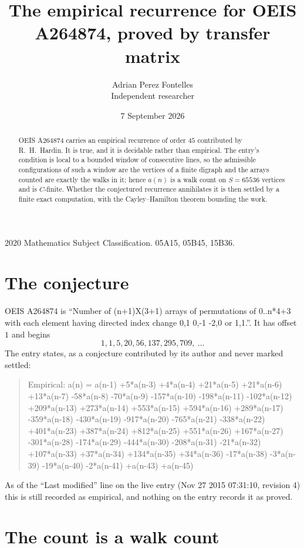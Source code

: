 \documentclass[11pt,a4paper]{article}
\title{The empirical recurrence for OEIS A264874, proved by transfer matrix}
\author{Adrian Perez Fontelles\\ \small Independent researcher}
\date{7 September 2026}
\theoremstyle{plain}
\theoremstyle{definition}
\begin{document}
\maketitle

\begin{abstract}
OEIS A264874 carries an empirical recurrence of order $45$ contributed by R.~H.~Hardin. It is
true, and it is decidable rather than empirical. The entry's condition is local to a bounded window of consecutive lines, so
the admissible configurations of such a window are the vertices of a finite digraph and the
arrays counted are exactly the walks in it; hence $a(n)$ is a walk count on $S=65536$ vertices
and is $C$-finite. Whether the conjectured recurrence annihilates it is then settled by a
finite exact computation, with the Cayley--Hamilton theorem bounding the work.
\end{abstract}

\noindent\small 2020 Mathematics Subject Classification. 05A15, 05B45, 15B36.\normalsize

\section{The conjecture}

OEIS A264874 is ``Number of (n+1)X(3+1) arrays of permutations of 0..n*4+3 with each element having directed index change 0,1 0,-1 -2,0 or 1,1.''. It has offset $1$ and begins
\[
1, 1, 5, 20, 56, 137, 295, 709,\ \dots
\]
The entry states, as a conjecture contributed by its author and never marked settled:
\begin{quote}
Empirical: a(n) = a(n-1) +5*a(n-3) +4*a(n-4) +21*a(n-5) +21*a(n-6) +13*a(n-7) -58*a(n-8) -70*a(n-9) -157*a(n-10) -198*a(n-11) -102*a(n-12) +209*a(n-13) +273*a(n-14) +553*a(n-15) +594*a(n-16) +289*a(n-17) -359*a(n-18) -430*a(n-19) -917*a(n-20) -765*a(n-21) -338*a(n-22) +401*a(n-23) +387*a(n-24) +812*a(n-25) +551*a(n-26) +167*a(n-27) -301*a(n-28) -174*a(n-29) -444*a(n-30) -208*a(n-31) -21*a(n-32) +107*a(n-33) +37*a(n-34) +134*a(n-35) +34*a(n-36) -17*a(n-38) -3*a(n-39) -19*a(n-40) -2*a(n-41) +a(n-43) +a(n-45)
\end{quote}
As of the ``Last modified'' line on the live entry (Nov 27 2015 07:31:10, revision 4) this is still
recorded as empirical, and nothing on the entry records it as proved.

\section{The count is a walk count}
\end{document}

